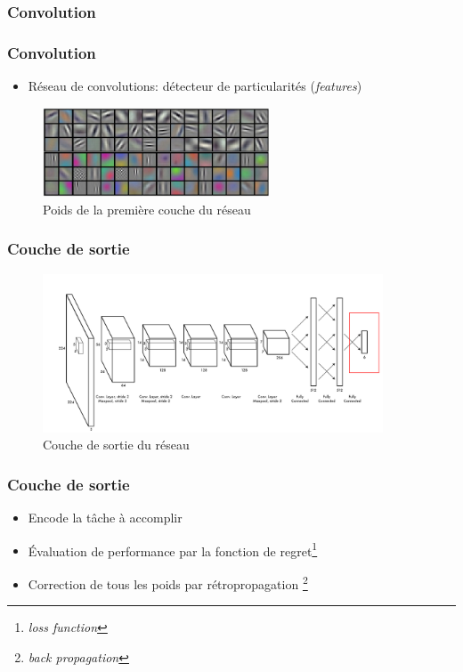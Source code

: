 \documentclass{beamer}
\begin{document}
\begin{frame}
  \frametitle{Convolution}
  \begin{center}
  \end{center}
\end{frame}

\begin{frame}
  \frametitle{Convolution}
  \begin{itemize}
  \item Réseau de convolutions: détecteur de particularités (\emph{features})
  \end{itemize}
  \begin{figure}
    \centering
    \includegraphics[width=0.6\textwidth]{img/weights.jpeg}
    \caption{Poids de la première couche du réseau}
    \label{fig:weights}
  \end{figure}
\end{frame}

\begin{frame}
  \frametitle{Couche de sortie}
  \begin{figure}
    \centering
    \includegraphics[width=0.9\textwidth]{img/last-layer.png}
    \caption{Couche de sortie du réseau}
    \label{fig:last_layer}
  \end{figure}
\end{frame}

\begin{frame}
  \frametitle{Couche de sortie}
  \begin{itemize}
  \item Encode la tâche à accomplir
  \item Évaluation de performance par la fonction de regret\footnote{\emph{loss function}}
  \item Correction de tous les poids par rétropropagation \footnote{\emph{back propagation}}
  \end{itemize}
\end{frame}
\end{document}

